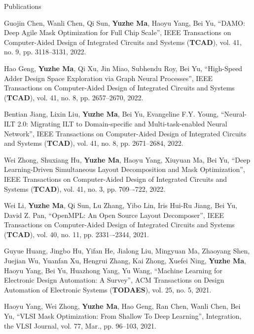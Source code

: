 \begin{rSection}{Publications}
\begin{etaremune}
\item {
    Guojin Chen, Wanli Chen, Qi Sun, \textbf{Yuzhe Ma}, Haoyu Yang, Bei Yu,
    ``DAMO: Deep Agile Mask Optimization for Full Chip Scale'',
    IEEE Transactions on Computer-Aided Design of Integrated Circuits and Systems (\textbf{TCAD}), vol. 41, no. 9, pp. 3118--3131, 2022. 
}


\item {
    Hao Geng, \textbf{Yuzhe Ma}, Qi Xu, Jin Miao, Subhendu Roy, Bei Yu,
    ``High-Speed Adder Design Space Exploration via Graph Neural Processes'',
    IEEE Transactions on Computer-Aided Design of Integrated Circuits and Systems (\textbf{TCAD}), vol. 41, no. 8, pp. 2657--2670, 2022.
}


\item {
    Bentian Jiang, Lixin Liu, \textbf{Yuzhe Ma}, Bei Yu, Evangeline F.Y. Young,
    ``Neural-ILT 2.0: Migrating ILT to Domain-specific and Multi-task-enabled Neural Network'',
    IEEE Transactions on Computer-Aided Design of Integrated Circuits and Systems (\textbf{TCAD}), vol. 41, no. 8, pp. 2671--2684, 2022.
}

\item {
    Wei Zhong, Shuxiang Hu, \textbf{Yuzhe Ma}, Haoyu Yang, Xiuyuan Ma, Bei Yu,
    ``Deep Learning-Driven Simultaneous Layout Decomposition and Mask Optimization'',
    IEEE Transactions on Computer-Aided Design of Integrated Circuits and Systems (\textbf{TCAD}),  vol. 41, no. 3, pp. 709–-722, 2022. 
}

\item{
    Wei Li, \textbf{Yuzhe Ma}, Qi Sun, Lu Zhang, Yibo Lin, Iris Hui-Ru Jiang, Bei Yu, David Z. Pan,
    ``OpenMPL: An Open Source Layout Decomposer'',
    IEEE Transactions on Computer-Aided Design of Integrated Circuits and Systems (\textbf{TCAD}), vol. 40, no. 11, pp. 2331–-2344, 2021.
}

\item {
        Guyue Huang, Jingbo Hu, Yifan He, Jialong Liu, Mingyuan Ma, Zhaoyang Shen, Juejian Wu, Yuanfan Xu, Hengrui Zhang, Kai Zhong, Xuefei Ning, \textbf{Yuzhe Ma}, Haoyu Yang, Bei Yu, Huazhong Yang, Yu Wang,
        ``Machine Learning for Electronic Design Automation: A Survey'',
        ACM Transactions on Design Automation of Electronic Systems (\textbf{TODAES}), vol. 25, no. 5, 2021.
}

\item{
        Haoyu Yang, Wei Zhong, \textbf{Yuzhe Ma}, Hao Geng, Ran Chen, Wanli Chen, Bei Yu,
        ``VLSI Mask Optimization: From Shallow To Deep Learning'',
        Integration, the VLSI Journal, vol. 77, Mar., pp. 96–103, 2021.
    }


\end{etaremune}
\end{rSection}
